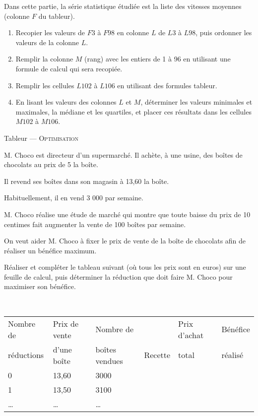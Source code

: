 \documentclass[11pt]{article}
\begin{document}
\begin{question}[Statistiques]

  Dans cette partie, la série statistique étudiée est la liste des vitesses moyennes (colonne $F$ du tableur).

  \begin{enumerate}
    \item    Recopier les valeurs de $F3$ à $F98$ en colonne $L$ de $L3$ à $L98$, puis ordonner les valeurs de la colonne $L$.

    \item    Remplir la colonne $M$ (rang) avec les entiers de 1 à 96 en utilisant une formule de calcul qui sera recopiée.

    \item    Remplir les cellules $L102$ à $L106$ en utilisant des formules tableur.

    \item    En lisant les valeurs des colonnes $L$ et $M$, déterminer les valeurs minimales et maximales, la médiane et les quartiles, et placer ces résultats dans les cellules $M102$ à $M106$.

  \end{enumerate}
\end{question}

\newpage

\begin{center}
  {\large
    Tableur
    ---
    \textsc{Optimisation}
  }
\end{center}

M. Choco est directeur d'un supermarché. Il achète, à une usine, des boîtes de chocolats au prix de 5 \officialeuro{} la boîte.

\noindent Il revend ses boîtes dans son magasin à 13,60 \officialeuro{} la boîte.

\noindent Habituellement, il en vend 3 000 par semaine.

\noindent M. Choco réalise une étude de marché qui montre que toute baisse du prix de 10 centimes fait augmenter la vente de 100 boîtes par semaine.

\noindent On veut aider M. Choco à fixer le prix de vente de la boîte de chocolats afin de réaliser un bénéfice maximum. 

Réaliser et compléter le tableau suivant (où tous les prix sont en euros) sur une feuille de calcul, puis déterminer la réduction que doit faire M. Choco pour maximiser son bénéfice.

~

{\small
\noindent
\hspace{-2em}
\begin{tabular}{|l|l|l|l|l|l|}
  \hline
  Nombre de
  & Prix de vente
  & Nombre de
  & 
  & Prix d'achat
  & Bénéfice
  \\
  réductions
  & d'une boîte
  & boîtes vendues
  & Recette
  & total
  & réalisé
  \\
  \hline
  0 & 13,60 & 3000 & & & \\
  1 & 13,50 & 3100 & & & \\
  \ldots & \ldots & \ldots & & & \\
  \hline
\end{tabular}
}
\end{document}
